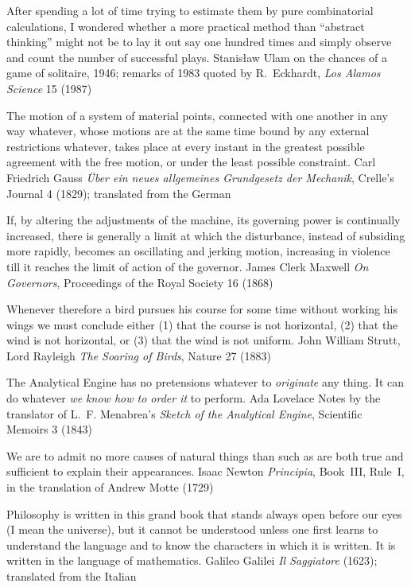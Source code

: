   {After spending a lot of time trying to estimate them by pure combinatorial calculations, I
   wondered whether a more practical method than \enquote{abstract thinking} might not be to lay it
   out say one hundred times and simply observe and count the number of successful plays.}
  {Stanisław Ulam}
  {on the chances of a game of solitaire, 1946; remarks of 1983 quoted by R.~Eckhardt, \emph{Los
   Alamos Science} 15 (1987)}

  {The motion of a system of material points, connected with one another in any way whatever,
   whose motions are at the same time bound by any external restrictions whatever, takes place at
   every instant in the greatest possible agreement with the free motion, or under the least
   possible constraint.}
  {Carl Friedrich Gauss}
  {\emph{Über ein neues allgemeines Grundgesetz der Mechanik}, Crelle's Journal 4 (1829); translated
   from the German}

  {If, by altering the adjustments of the machine, its governing power is continually increased,
   there is generally a limit at which the disturbance, instead of subsiding more rapidly, becomes
   an oscillating and jerking motion, increasing in violence till it reaches the limit of action
   of the governor.}
  {James Clerk Maxwell}
  {\emph{On Governors}, Proceedings of the Royal Society 16 (1868)}

  {Whenever therefore a bird pursues his course for some time without working his wings we must
   conclude either (1) that the course is not horizontal, (2) that the wind is not horizontal, or
   (3) that the wind is not uniform.}
  {John William Strutt, Lord Rayleigh}
  {\emph{The Soaring of Birds}, Nature 27 (1883)}

  {The Analytical Engine has no pretensions whatever to \emph{originate} any thing. It can do
   whatever \emph{we know how to order it} to perform.}
  {Ada Lovelace}
  {Notes by the translator of L.~F. Menabrea's \emph{Sketch of the Analytical Engine}, Scientific
   Memoirs 3 (1843)}

  {We are to admit no more causes of natural things than such as are both true and sufficient to
   explain their appearances.}
  {Isaac Newton}
  {\emph{Principia}, Book~III, Rule~I, in the translation of Andrew Motte (1729)}

  {Philosophy is written in this grand book that stands always open before our eyes (I mean the
   universe), but it cannot be understood unless one first learns to understand the language and
   to know the characters in which it is written. It is written in the language of mathematics.}
  {Galileo Galilei}
  {\emph{Il Saggiatore} (1623); translated from the Italian}

